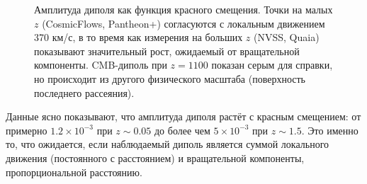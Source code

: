 \documentclass[11pt,a4paper]{article}
\begin{document}
	\begin{figure}[htbp]
		\centering
		\caption{Амплитуда диполя как функция красного смещения. Точки на малых \(z\) (CosmicFlows, Pantheon+) согласуются с локальным движением 370 км/с, в то время как измерения на больших \(z\) (NVSS, Quaia) показывают значительный рост, ожидаемый от вращательной компоненты. CMB-диполь при \(z=1100\) показан серым для справки, но происходит из другого физического масштаба (поверхность последнего рассеяния).}
		\label{fig:dipole_growth}
	\end{figure}
	
	Данные ясно показывают, что амплитуда диполя растёт с красным смещением: от примерно \(1.2 \times 10^{-3}\) при \(z\sim0.05\) до более чем \(5\times10^{-3}\) при \(z\sim1.5\). Это именно то, что ожидается, если наблюдаемый диполь является суммой локального движения (постоянного с расстоянием) и вращательной компоненты, пропорциональной расстоянию.
	
\end{document}
